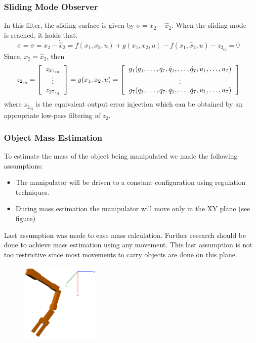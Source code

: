 \documentclass[9pt,spanish,aspectratio=1610]{beamer}
\begin{document}
\begin{frame}\frametitle{Sliding Mode Observer}
In this filter, the sliding surface is given by $\sigma = x_2 - \hat{x}_2$. When the sliding mode is reached, it holds that:
\[\sigma = \dot{\sigma} = \dot{x}_2 - \dot{\hat{x}}_2 = f(x_1, x_2, u) + g(x_1, x_2, u) - f(x_1, \hat{x}_2, u) - z_{2_{eq}} = 0\]
Since,  $x_2 = \hat{x}_2$, then
\begin{equation*}
  z_{2_{eq}} = \left[\begin{tabular}{c}
      $z_{21_{eq}}$\\
      $\vdots$\\
      $z_{27_{eq}}$
    \end{tabular}\right] = g(x_1, x_2, u) =
  \left[\begin{tabular}{c}
      $g_1(q_1,\dots, q_7, \dot{q}_1, \dots, \dot{q}_7, u_1, \dots,u_7)$\\
      $\vdots$\\
      $g_7(q_1,\dots, q_7, \dot{q}_1, \dots, \dot{q}_7, u_1, \dots,u_7)$
    \end{tabular}\right] 
\end{equation*}
where $z_{2_{eq}}$ is the equivalent output error injection which can be obtained by an appropriate low-pass filtering of $z_2$. 
\end{frame}

\begin{frame}\frametitle{Object Mass Estimation}
  To estimate the mass of the object being manipulated we made the following assumptions:
  \begin{itemize}
  \item The manipulator will be driven to a constant configuration using regulation techniques.
  \item During mass estimation the manipulator will move only in the XY plane (see figure)
  \end{itemize}
  Last assumption was made to ease mass calculation. Further research should be done to achieve mass estimation using any movement. This last assumption is not too restrictive since most movements to carry objects are done on this plane.\\
  \begin{figure}
    \centering
    \includegraphics[width=0.35\textwidth]{Figures/left_arm_XY.png}
  \end{figure}
\end{frame}
\end{document}
